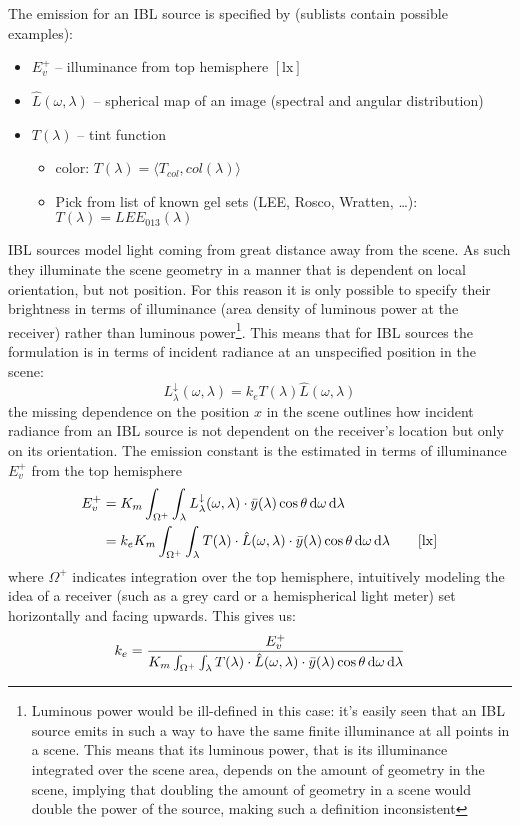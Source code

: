 The emission for an \gls{IBL} source is specified by (sublists contain possible examples):

\begin{itemize}
\item $E^+_v$ -- illuminance from top hemisphere $[\si{\lux}]$
\item $\hat{L}(\omega,\lambda)$ -- spherical map of an image (spectral and angular distribution)
\item $T(\lambda)$ -- tint function
  \begin{itemize}\small\it
  \item color: $T(\lambda) = \langle T_{col}, col(\lambda) \rangle$
  \item Pick from list of known gel sets (LEE, Rosco, Wratten, \ldots): $T(\lambda) = LEE_{013} (\lambda)$
  \end{itemize}
\end{itemize}
\Gls{IBL} sources model light coming from great distance away from the scene. As
such they illuminate the scene geometry in a manner that is dependent on
local orientation, but not position. For this reason it is only possible to
specify their brightness in terms of illuminance (area density of luminous power
at the receiver) rather than luminous power\footnote{Luminous power would be
ill-defined in this case: it's easily seen that an \gls{IBL} source emits in
such a way to have the same finite illuminance at all points in a scene. This
means that its luminous power, that is its illuminance integrated over the scene
area, depends on the amount of geometry in the scene, implying that doubling the
amount of geometry in a scene would double the power of the source, making
such a definition inconsistent}.
This means that for \gls{IBL} sources the formulation is in terms of incident
radiance at an unspecified position in the scene:
\begin{equation}
L_{\lambda}^\downarrow(\omega,\lambda) = k_e T(\lambda) \hat{L}(\omega,\lambda)
\end{equation}
the missing dependence on the position $x$ in the scene outlines how incident
radiance from an \gls{IBL} source is not dependent on the receiver's location
but only on its orientation. The emission constant is the estimated in terms of
illuminance $E^+_v$ from the top hemisphere
\begin{align*}
E^+_v &= K_m \int_{\Omega^+} \int_\lambda L_{\lambda}^\downarrow(\omega,\lambda)
\cdot\bar y(\lambda) \cos\theta \d\omega\d\lambda \\
&= k_e K_m\int_{\Omega^+}\int_{\lambda} T(\lambda) \cdot \hat{L}(\omega,\lambda)
\cdot\bar y(\lambda) \cos\theta \d\omega\d\lambda
\qquad [\si{\lux}]
\end{align*}
where $\Omega^+$ indicates integration over the top hemisphere, intuitively
modeling the idea of a receiver (such as a grey card or a hemispherical light
meter) set horizontally and facing upwards. This gives us:
\begin{equation}
k_e = \frac{E^+_v}{K_m\int_{\Omega^+}\int_{\lambda} T(\lambda) \cdot
\hat{L}(\omega,\lambda) \cdot \bar y(\lambda)\cos\theta \mathop{}\!\mathrm{d}\omega\mathop{}\!\mathrm{d}\lambda}
\end{equation}

